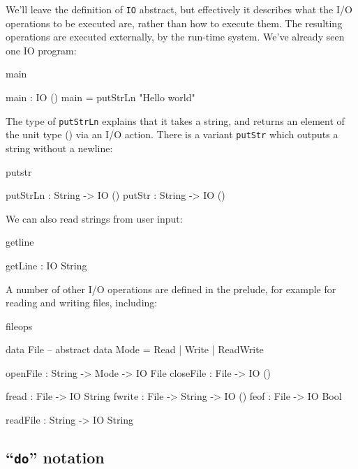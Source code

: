 \noindent
We'll leave the definition of \texttt{IO} abstract, but effectively it describes what
the I/O operations to be executed are, rather than how to execute them. The
resulting operations are executed externally,
by the run-time system. We've already seen one IO
program:

\begin{SaveVerbatim}{main}

main : IO ()
main = putStrLn "Hello world"

\end{SaveVerbatim}

\noindent
The type of \texttt{putStrLn} explains that it takes a string, and returns an
element of the unit type () via an I/O action. There is a variant \texttt{putStr} which
outputs a string without a newline:

\begin{SaveVerbatim}{putstr}

putStrLn : String -> IO ()
putStr   : String -> IO ()

\end{SaveVerbatim}

We can also read strings from user input:

\begin{SaveVerbatim}{getline}

getLine : IO String

\end{SaveVerbatim}

\noindent
A number of other I/O operations are defined in the prelude, for example for reading and
writing files, including:

\begin{SaveVerbatim}{fileops}

data File -- abstract
data Mode = Read | Write | ReadWrite

openFile  : String -> Mode -> IO File
closeFile : File -> IO ()

fread  : File -> IO String
fwrite : File -> String -> IO ()
feof   : File -> IO Bool

readFile : String -> IO String

\end{SaveVerbatim}

\subsection{``\texttt{do}'' notation}

\label{sect:do}

